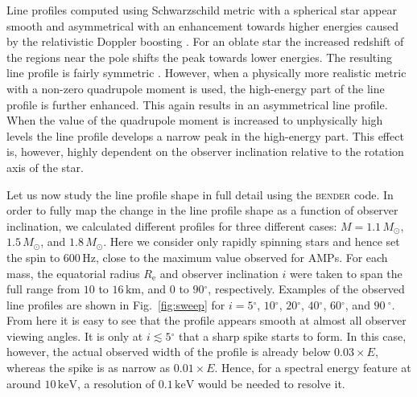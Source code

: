 \documentclass{aa}
\newcommand{\refe}[1]{#1}
\newcommand{\refedel}[1]{}
\newcommand{\sch}{Schwarzschild }
\newcommand{\Msun}{\ensuremath{M_{\odot}}}
\renewcommand{\deg}{\ensuremath{^{\circ}}}
\begin{document}
\refe{Line profiles computed using \sch metric with a spherical star appear smooth and asymmetrical with an enhancement towards higher energies caused by the relativistic Doppler boosting \citep[see e.g.][]{OP03}.}
\refe{For an oblate star the increased redshift of the regions near the pole shifts the peak towards lower energies.}
\refe{The resulting line profile is fairly symmetric \citep[see e.g.][]{BPO13}.}
\refe{However, when a physically more realistic metric with a non-zero quadrupole moment is used, the high-energy part of the line profile is further enhanced.}
\refe{This again results in an asymmetrical line profile.}
\refe{When the value of the quadrupole moment is increased to unphysically high levels the line profile develops a narrow peak in the high-energy part.}
\refe{This effect is, however, highly dependent on the observer inclination relative to the rotation axis of the star.}


Let us now study the line profile shape in full detail using the \textsc{bender} code.
In order to fully map the change in the line profile shape as a function of observer inclination, we calculated different profiles for three different cases: $M=1.1\,\Msun$, $1.5\,\Msun$, and $1.8\,\Msun$.
Here we consider only rapidly spinning stars and hence set the spin to $600\,\mathrm{Hz}$, close to the maximum value observed for AMPs.
For each mass, the equatorial radius $R_{\mathrm{e}}$ and observer inclination $i$ were taken to span the full range from $10$ to $16\,\mathrm{km}$, and $0$ to $90\deg$, respectively.
Examples of the observed line profiles are shown in Fig.~\ref{fig:sweep} for $i=5\deg$, $10\deg$, $20\deg$, $40\deg$, $60\deg$, and $90~\deg$.
From here it is easy to see that the profile appears smooth at almost all observer viewing angles.
It is only at $i \lesssim 5\deg$ that a sharp spike starts to form.
In this case, however, the actual observed width of the profile is already below $0.03 \times E$, whereas the spike is as narrow as $0.01 \times E$.
Hence, for a spectral energy feature at around $10\,\mathrm{keV}$, a resolution of $0.1\,\mathrm{keV}$ would be needed to resolve it.
\refedel{At the moment, there are no existing observational facilities with sufficient resolution to separate the compact spike from the rest of the line profile.}
\end{document}
